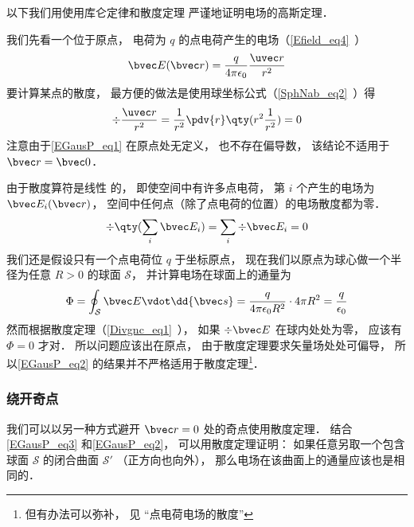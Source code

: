 

以下我们用使用库仑定律和散度定理 严谨地证明电场的高斯定理．

我们先看一个位于原点， 电荷为 $q$ 的点电荷产生的电场（\autoref{Efield_eq4}~）
\begin{equation}\label{EGausP_eq1}
\bvec E(\bvec r) = \frac{q}{4\pi\epsilon_0}\frac{\uvec r}{r^2}
\end{equation}
要计算某点的散度， 最方便的做法是使用球坐标公式（\autoref{SphNab_eq2}~）得
\begin{equation}
\div \frac{\uvec r}{r^2} = \frac{1}{r^2} \pdv{r} \qty(r^2 \frac{1}{r^2}) = 0
\end{equation}
注意由于\autoref{EGausP_eq1} 在原点处无定义， 也不存在偏导数， 该结论不适用于 $\bvec r = \bvec 0$．

由于散度算符是线性%
的， 即使空间中有许多点电荷， 第 $i$ 个产生的电场为 $\bvec E_i(\bvec r)$， 空间中任何点（除了点电荷的位置）的电场散度都为零．
\begin{equation}\label{EGausP_eq3}
\div \qty(\sum_i \bvec E_i) = \sum_i \div \bvec E_i = 0
\end{equation}
我们还是假设只有一个点电荷位 $q$ 于坐标原点， 现在我们以原点为球心做一个半径为任意 $R > 0$ 的球面 $\mathcal S$， 并计算电场在球面上的通量为
\begin{equation}\label{EGausP_eq2}
\Phi = \oint_{\mathcal S} \bvec E \vdot \dd{\bvec s} = \frac{q}{4\pi\epsilon_0 R^2} \cdot 4\pi R^2 = \frac{q}{\epsilon_0}
\end{equation}
然而根据散度定理（\autoref{Divgnc_eq1}~）， 如果 $\div \bvec E$ 在球内处处为零， 应该有 $\Phi = 0$ 才对． 所以问题应该出在原点， 由于散度定理要求矢量场处处可偏导， 所以\autoref{EGausP_eq2} 的结果并不严格适用于散度定理\footnote{但有办法可以弥补， 见 “点电荷电场的散度”}． %

\subsubsection{绕开奇点}
我们可以以另一种方式避开 $\bvec r = 0$ 处的奇点使用散度定理． 结合\autoref{EGausP_eq3} 和\autoref{EGausP_eq2}， 可以用散度定理证明： 如果任意另取一个包含球面 $\mathcal S$ 的闭合曲面 $\mathcal S'$ （正方向也向外）， 那么电场在该曲面上的通量应该也是相同的．

